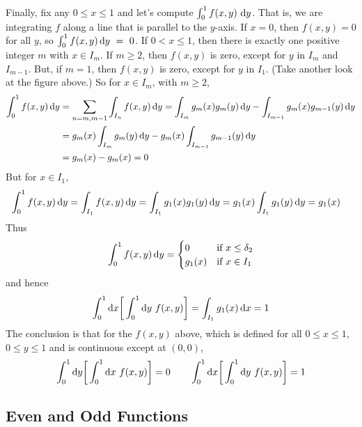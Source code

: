 \begin{eg}
Finally, fix any $0\le x\le 1$ and let's compute $\int_0^1 f(x,y)\ \dee{y}$.
That is, we are integrating $f$ along a line that is parallel to the $y$-axis.
If $x=0$, then $f(x,y)=0$ for all $y$, so $\int_0^1 f(x,y)\,\mathrm{d}y~=~0$.
If $0<x\le 1$, then there is exactly one positive integer $m$ with 
$x\in I_m$. If $m\ge 2$, then $f(x,y)$ is zero, except for $y$ in $I_m$ and 
$I_{m-1}$. But, if $m=1$, then $f(x,y)$ is zero, except for $y$ in $I_1$.
(Take another look at the figure above.) 
So for $x\in I_m$, with $m\ge 2$,
\begin{align*}
\int_0^1 f(x,y)\,\mathrm{d}y&=\sum_{n=m,m-1}\int_{I_n} f(x,y)\,\mathrm{d}y
=\int_{I_m} g_m(x)g_m(y)\,\mathrm{d}y-\int_{I_{m-1}} g_{m}(x)g_{m-1}(y)\,\mathrm{d}y \\
&=g_m(x)\int_{I_m} g_m(y)\,\mathrm{d}y-g_m(x)\int_{I_{m-1}} g_{m-1}(y)\,\mathrm{d}y \\
&=g_m(x)-g_m(x)=0
\end{align*}
But for $x\in I_1$,
\begin{align*}
\int_0^1 f(x,y)\,\mathrm{d}y&=\int_{I_1} f(x,y)\,\mathrm{d}y
=\int_{I_1} g_1(x)g_1(y)\,\mathrm{d}y
=g_1(x)\int_{I_1} g_1(y)\,\mathrm{d}y
=g_1(x)
\end{align*}
 Thus
\begin{equation*}
\int_0^1 f(x,y)\,\mathrm{d}y=\begin{cases}
                          0&\text{if $x\le \delta_2$} \\
                         g_1(x)&\text{if $x\in I_1$}
                          \end{cases}
\end{equation*}
and hence
\begin{equation*}
\int_0^1\dee{x}\bigg[\int_0^1 \dee{y}\ f(x,y)\bigg]
=\int_{I_1}g_1(x)\,\dee{x}=1
\end{equation*}
The conclusion is that for the $f(x,y)$ above, which is defined 
for all $0\le x\le 1$, $0\le y\le 1$ and is continuous except at $(0,0)$,
\begin{equation*}
\int_0^1\dee{y}\bigg[\int_0^1 \dee{x}\ f(x,y)\bigg]=0
\qquad
\int_0^1\dee{x}\bigg[\int_0^1 \dee{y}\ f(x,y)\bigg]=1
\end{equation*}
\end{eg}

\subsection{Even and Odd Functions}
\label{sec int symmetry}

